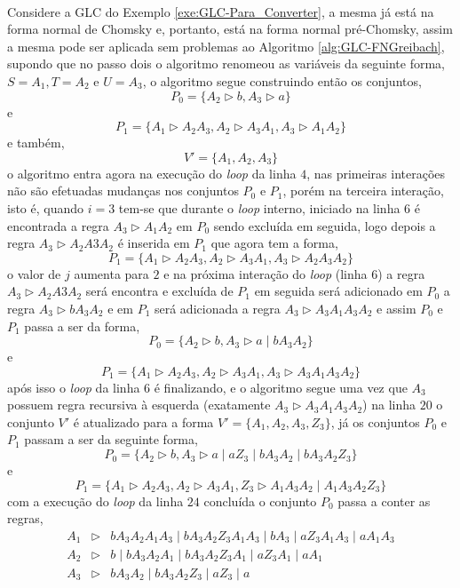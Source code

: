 \

\newpage
\begin{example}
    Considere a GLC do Exemplo \ref{exe:GLC-Para_Converter}, a mesma já está na forma normal de Chomsky e, portanto, está na forma normal pré-Chomsky, assim a mesma pode ser aplicada sem problemas ao Algoritmo \ref{alg:GLC-FNGreibach}, supondo que no passo dois o algoritmo renomeou as variáveis da seguinte forma, $S = A_1, T = A_2$ e $U = A_3$, o algoritmo segue construindo então os conjuntos, 
    $$P_0 = \{A_2\rhd b, A_3 \rhd a\}$$
    e
    $$P_1 = \{A_1 \rhd A_2A_3, A_2 \rhd A_3A_1, A_3 \rhd A_1A_2\}$$
    e também, 
    $$V' = \{A_1, A_2, A_3\}$$
    o algoritmo entra agora na execução do \textit{loop} da linha $4$, nas primeiras interações não são efetuadas mudanças nos conjuntos $P_0$ e $P_1$, porém na terceira interação, isto é, quando $i = 3$ tem-se que durante o \textit{loop} interno, iniciado na linha $6$ é encontrada a regra $A_3 \rhd A_1A_2$ em $P_0$ sendo excluída em seguida, logo depois a regra  $A_3 \rhd A_2A3A_2$ é inserida em $P_1$ que agora tem a forma, 
    $$P_1 = \{A_1 \rhd A_2A_3, A_2 \rhd A_3A_1, A_3 \rhd A_2A_3A_2\}$$
    o valor de $j$ aumenta para $2$ e na próxima interação do \textit{loop} (linha $6$) a regra $A_3 \rhd A_2A3A_2$ será encontra e excluída de $P_1$ em seguida será adicionado em $P_0$ a regra $A_3 \rhd bA_3A_2$ e em $P_1$ será adicionada a regra $A_3 \rhd A_3A_1A_3A_2$ e assim $P_0$ e $P_1$ passa a ser da forma, 
    $$P_0 = \{A_2\rhd b, A_3 \rhd a \mid bA_3A_2\}$$
    e
    $$P_1 = \{A_1 \rhd A_2A_3, A_2 \rhd A_3A_1, A_3 \rhd A_3A_1A_3A_2\}$$
    após isso o \textit{loop} da linha $6$ é finalizando, e o algoritmo segue uma vez que $A_3$ possuem regra recursiva à esquerda (exatamente $A_3 \rhd A_3A_1A_3A_2$) na linha $20$ o conjunto $V'$ é atualizado para a forma $V' = \{A_1, A_2, A_3, Z_3\}$, já os conjuntos $P_0$ e $P_1$ passam a ser da seguinte forma, 
    $$P_0 = \{A_2\rhd b, A_3 \rhd a \mid aZ_3 \mid bA_3A_2 \mid bA_3A_2Z_3\}$$
    e
    $$P_1 = \{A_1 \rhd A_2A_3, A_2 \rhd A_3A_1, Z_3 \rhd A_1A_3A_2 \mid A_1A_3A_2Z_3\}$$
    com a execução do \textit{loop} da linha $24$ concluída o conjunto $P_0$  passa a conter as regras,
    \begin{eqnarray*}
        A_1 & \rhd & bA_3A_2A_1A_3 \mid bA_3A_2Z_3A_1A_3 \mid bA_3 \mid aZ_3A_1A_3 \mid aA_1A_3\\
        A_2 & \rhd & b \mid bA_3A_2A_1 \mid bA_3A_2Z_3A_1 \mid aZ_3A_1 \mid aA_1\\
        A_3 & \rhd & bA_3A_2 \mid bA_3A_2Z_3 \mid aZ_3 \mid a
    \end{eqnarray*}

\end{example}
